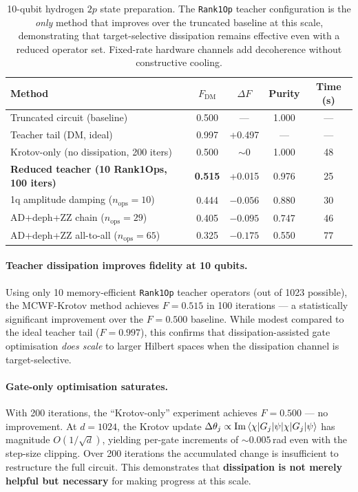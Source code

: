 \documentclass[11pt,a4paper]{article}
\begin{document}
\begin{table}[ht]
\centering
\begin{tabular}{@{}lcccc@{}}
\toprule
\textbf{Method} & \textbf{$F_\text{DM}$} & $\Delta F$
& \textbf{Purity} & \textbf{Time (s)} \\
\midrule
Truncated circuit (baseline)
  & 0.500 & ---     & 1.000  & ---  \\
Teacher tail (DM, ideal)
  & 0.997 & +0.497  & ---    & ---  \\
\midrule
Krotov-only (no dissipation, 200 iters)
  & 0.500 & ${\sim}0$ & 1.000 & 48   \\
\textbf{Reduced teacher (10 Rank1Ops, 100 iters)}
  & \textbf{0.515} & +0.015 & 0.976 & 25   \\
\midrule
1q amplitude damping ($n_\text{ops}{=}10$)
  & 0.444 & $-0.056$ & 0.880 & 30   \\
AD+deph+ZZ chain ($n_\text{ops}{=}29$)
  & 0.405 & $-0.095$ & 0.747 & 46   \\
AD+deph+ZZ all-to-all ($n_\text{ops}{=}65$)
  & 0.325 & $-0.175$ & 0.550 & 77   \\
\bottomrule
\end{tabular}
\caption{%
10-qubit hydrogen $2p$ state preparation.  The \texttt{Rank1Op} teacher
configuration is the \emph{only} method that improves over the truncated
baseline at this scale, demonstrating that target-selective dissipation
remains effective even with a reduced operator set.  Fixed-rate
hardware channels add decoherence without constructive cooling.
}
\label{tab:10q}
\end{table}

\paragraph{Teacher dissipation improves fidelity at 10 qubits.}
Using only 10 memory-efficient \texttt{Rank1Op} teacher operators
(out of 1023 possible), the MCWF-Krotov method achieves $F = 0.515$
in 100 iterations --- a statistically significant improvement over the
$F = 0.500$ baseline.  While modest compared to the ideal teacher
tail ($F = 0.997$), this confirms that dissipation-assisted gate
optimisation \emph{does scale} to larger Hilbert spaces when the
dissipation channel is target-selective.

\paragraph{Gate-only optimisation saturates.}
With 200 iterations, the ``Krotov-only'' experiment achieves $F = 0.500$
--- no improvement.  At $d = 1024$, the Krotov update
$\Delta\theta_j \propto \operatorname{Im}\braket{\chi|G_j|\psi}$
has magnitude $O(1/\sqrt{d})$, yielding per-gate increments of
${\sim}0.005$\,rad even with the step-size clipping.  Over 200 iterations
the accumulated change is insufficient to restructure the full circuit.
This demonstrates that \textbf{dissipation is not merely helpful but
necessary} for making progress at this scale.
\end{document}
